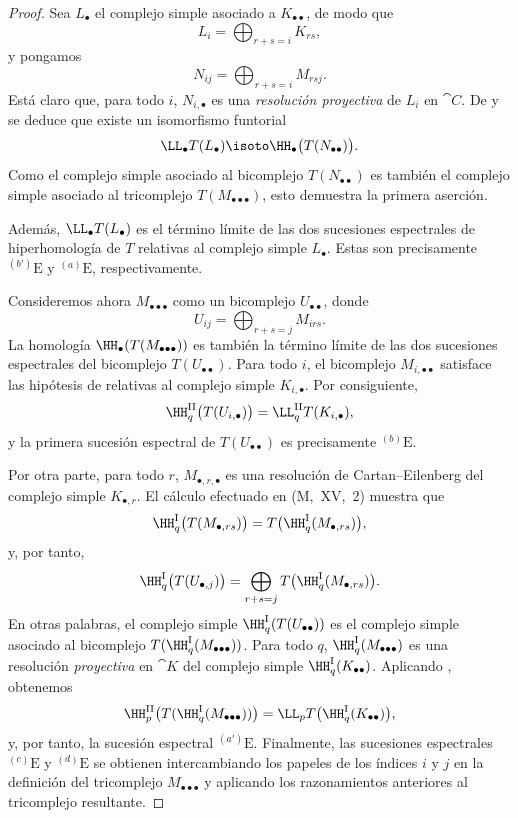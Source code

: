 \documentclass[oneside]{amsart}
\begin{document}
\begin{proof}
Sea $L_\bullet$ el complejo simple asociado a
$K_{\bullet\bullet}$, de modo que
\[
  L_i=\bigoplus_{r+s=i}K_{rs},
\]
y pongamos
\[
  N_{ij}=\bigoplus_{r+s=i}M_{rsj}.
\]
Está claro que, para todo $i$, $N_{i,\bullet}$ es una \emph{resolución proyectiva}
de $L_i$ en $\cat{C}$.
De  y  se deduce que existe un
isomorfismo funtorial
\[
  \LL_\bullet T(L_\bullet)
  \isoto
  \HH_\bullet\bigl(T(N_{\bullet\bullet})\bigr).
\]
Como el complejo simple asociado al bicomplejo
$T(N_{\bullet\bullet})$ es también el complejo simple asociado al
tricomplejo $T(M_{\bullet\bullet\bullet})$, esto demuestra la primera aserción.

Además, $\LL_\bullet T(L_\bullet)$ es el término límite de las dos
sucesiones espectrales de hiperhomología  de $T$ relativas al
complejo simple $L_\bullet$.
Estas son precisamente ${}^{(b')}\mathrm{E}$ y ${}^{(a)}\mathrm{E}$,
respectivamente.

Consideremos ahora $M_{\bullet\bullet\bullet}$ como un bicomplejo
$U_{\bullet\bullet}$, donde
\[
  U_{ij}=\bigoplus_{r+s=j}M_{irs}.
\]
La homología $\HH_\bullet(T(M_{\bullet\bullet\bullet}))$ es también la
término límite de las dos sucesiones espectrales del bicomplejo
$T(U_{\bullet\bullet})$.
Para todo $i$, el bicomplejo $M_{i,\bullet\bullet}$ satisface las
hipótesis de  relativas al complejo simple
$K_{i,\bullet}$.
Por consiguiente,
\[
  \HH^{\mathrm{II}}_q\bigl(T(U_{i,\bullet})\bigr)
  =
  \LL^{\mathrm{II}}_qT(K_{i,\bullet}),
\]
y la primera sucesión espectral de $T(U_{\bullet\bullet})$ es precisamente
${}^{(b)}\mathrm{E}$.

Por otra parte, para todo $r$, $M_{\bullet,r,\bullet}$ es una
resolución de Cartan--Eilenberg del complejo simple $K_{\bullet,r}$.
El cálculo efectuado en (M,~XV,~2) muestra que
\[
  \HH^{\mathrm{I}}_q\bigl(T(M_{\bullet,rs})\bigr)
  =
  T\bigl(\HH^{\mathrm{I}}_q(M_{\bullet,rs})\bigr),
\]
y, por tanto,
\[
  \HH^{\mathrm{I}}_q\bigl(T(U_{\bullet,j})\bigr)
  =
  \bigoplus_{r+s=j}
  T\bigl(\HH^{\mathrm{I}}_q(M_{\bullet,rs})\bigr).
\]
En otras palabras, el complejo simple
$\HH^{\mathrm{I}}_q(T(U_{\bullet\bullet}))$ es el complejo simple
asociado al bicomplejo
$T(\HH^{\mathrm{I}}_q(M_{\bullet\bullet\bullet}))$.
Para todo $q$, $\HH^{\mathrm{I}}_q(M_{\bullet\bullet\bullet})$ es una
resolución \emph{proyectiva} en $\cat{K}$ del complejo simple
$\HH^{\mathrm{I}}_q(K_{\bullet\bullet})$.
Aplicando , obtenemos
\[
  \HH^{\mathrm{II}}_p
  \bigl(T(\HH^{\mathrm{I}}_q(M_{\bullet\bullet\bullet}))\bigr)
  =
  \LL_pT\bigl(\HH^{\mathrm{I}}_q(K_{\bullet\bullet})\bigr),
\]
y, por tanto, la sucesión espectral ${}^{(a')}\mathrm{E}$.
Finalmente, las sucesiones espectrales ${}^{(c)}\mathrm{E}$ y
${}^{(d)}\mathrm{E}$ se obtienen intercambiando los papeles de los
índices $i$ y $j$ en la definición del tricomplejo
$M_{\bullet\bullet\bullet}$ y aplicando los razonamientos anteriores al
tricomplejo resultante.
\end{proof}
\end{document}
